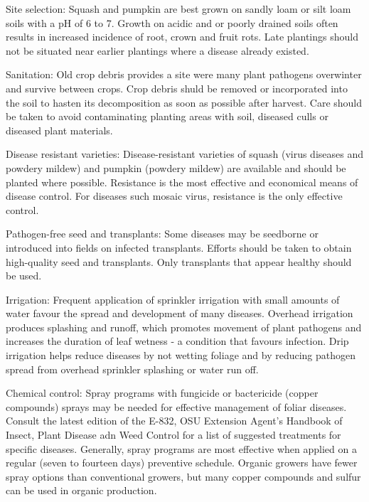 Site selection: Squash and pumpkin are best grown on sandly loam or silt loam soils with a pH of 6 to 7. Growth on acidic and or poorly drained soils often results in increased incidence of root, crown and fruit rots. Late plantings should not be situated near earlier plantings  where a disease already existed. \citep{johnPumpkinSquashDiseases2019a}

Sanitation: Old crop debris provides a site were many plant pathogens overwinter and survive between crops. Crop debris shuld be removed or incorporated into the soil to hasten its decomposition as soon as possible after harvest. Care should be taken to avoid contaminating planting areas with soil, diseased culls or diseased plant materials. \citep{johnPumpkinSquashDiseases2019a}

Disease resistant varieties: Disease-resistant varieties of squash (virus  diseases and powdery mildew) and pumpkin (powdery mildew) are available and should be planted where possible. Resistance is the most effective and economical means of disease control. For diseases such mosaic virus, resistance is the only effective control. \citep{johnPumpkinSquashDiseases2019a}

Pathogen-free seed and transplants: Some diseases may be seedborne or introduced into fields on infected transplants. Efforts should be taken to obtain high-quality seed and transplants. Only transplants that appear healthy should be used.\citep{johnPumpkinSquashDiseases2019a}

Irrigation: Frequent application of sprinkler irrigation with small amounts of water favour the spread and development of many diseases. Overhead irrigation produces splashing and runoff, which promotes movement of plant pathogens and increases the duration of leaf wetness - a condition that favours infection. Drip irrigation helps reduce diseases by not wetting foliage and by reducing pathogen spread from overhead sprinkler splashing or water run off. \citep{johnPumpkinSquashDiseases2019a}

Chemical control: Spray programs with fungicide or bactericide (copper compounds) sprays may be needed for effective management of foliar diseases. Consult the latest edition of the E-832, OSU Extension Agent's Handbook of Insect, Plant Disease adn Weed Control for a list of suggested treatments for specific diseases. Generally, spray programs are most effective when applied on a regular (seven to fourteen days) preventive schedule. Organic growers have fewer spray options than conventional growers, but many copper compounds and sulfur can be used in organic production.\citep{johnPumpkinSquashDiseases2019a}

